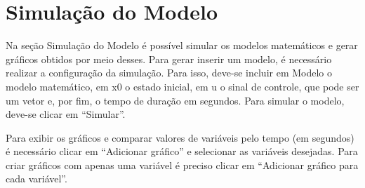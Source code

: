 
\chapter{Simulação do Modelo}%
\label{chapter:simulacao-do-modelo}

Na seção Simulação do Modelo é possível simular os modelos matemáticos e gerar
gráficos obtidos por meio desses. Para gerar inserir um modelo, é necessário
realizar a configuração da simulação. Para isso, deve-se incluir em Modelo o
modelo matemático, em x0 o estado inicial, em u o sinal de controle, que pode
ser um vetor e, por fim, o tempo de duração em segundos. Para simular o modelo,
deve-se clicar em “Simular”.

Para exibir os gráficos e comparar valores de variáveis pelo tempo (em segundos)
é necessário clicar em “Adicionar gráfico” e selecionar as variáveis desejadas.
Para criar gráficos com apenas uma variável é preciso clicar em “Adicionar
gráfico para cada variável”.
